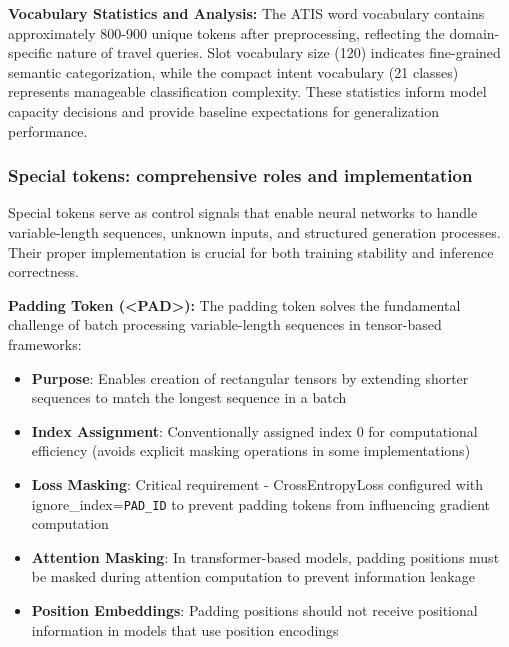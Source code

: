 \documentclass[conference]{IEEEtran}
\begin{document}
\textbf{Vocabulary Statistics and Analysis:}
The ATIS word vocabulary contains approximately 800-900 unique tokens after preprocessing, reflecting the domain-specific nature of travel queries. Slot vocabulary size (120) indicates fine-grained semantic categorization, while the compact intent vocabulary (21 classes) represents manageable classification complexity. These statistics inform model capacity decisions and provide baseline expectations for generalization performance.

\subsubsection{Special tokens: comprehensive roles and implementation}

Special tokens serve as control signals that enable neural networks to handle variable-length sequences, unknown inputs, and structured generation processes. Their proper implementation is crucial for both training stability and inference correctness.

\textbf{Padding Token (<PAD>):}
The padding token solves the fundamental challenge of batch processing variable-length sequences in tensor-based frameworks:
\begin{itemize}
  \item \textbf{Purpose}: Enables creation of rectangular tensors by extending shorter sequences to match the longest sequence in a batch
  \item \textbf{Index Assignment}: Conventionally assigned index 0 for computational efficiency (avoids explicit masking operations in some implementations)
  \item \textbf{Loss Masking}: Critical requirement - CrossEntropyLoss configured with ignore\_index=\texttt{PAD\_ID} to prevent padding tokens from influencing gradient computation
  \item \textbf{Attention Masking}: In transformer-based models, padding positions must be masked during attention computation to prevent information leakage
  \item \textbf{Position Embeddings}: Padding positions should not receive positional information in models that use position encodings
\end{itemize}
\end{document}
